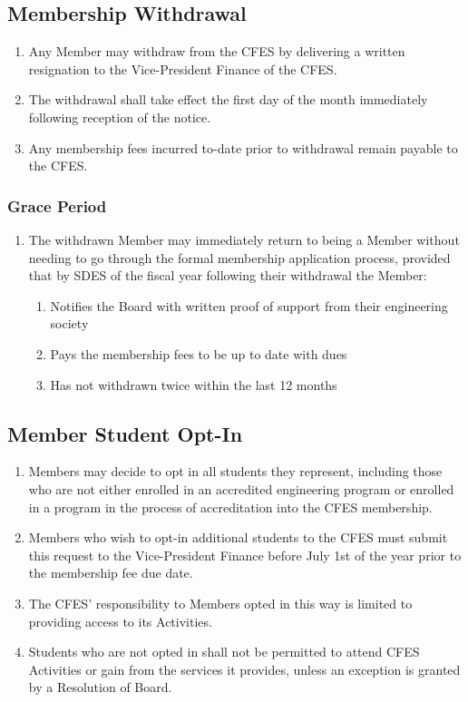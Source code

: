 \subsection{Membership Withdrawal}
\label{membership-membership-withdrawal}

\begin{enumerate}
 \item Any Member may withdraw from the CFES by delivering a written resignation to the Vice-President Finance of the CFES.
 \item The withdrawal shall take effect the first day of the month immediately following reception of the notice.
 \item Any membership fees incurred to-date prior to withdrawal remain payable to the CFES.
\end{enumerate}

\setcounter{subsubsection}{3}
\subsubsection{Grace Period}
\label{membership-withdrawal-grace-period}

\begin{enumerate}
 \item The withdrawn Member may immediately return to being a Member without needing to go through the formal membership application process, provided that by SDES of the fiscal year following their withdrawal the Member:
  \begin{enumerate}
   \item Notifies the Board with written proof of support from their engineering society
   \item Pays the membership fees to be up to date with dues
   \item Has not withdrawn twice within the last 12 months
  \end{enumerate}
\end{enumerate}

\subsection{Member Student Opt-In}
\label{membership-member-student-opt-in}

\begin{enumerate}
 \item Members may decide to opt in all students they represent, including those who are not either enrolled in an accredited engineering program or enrolled in a program in the process of accreditation into the CFES membership.
 \item Members who wish to opt-in additional students to the CFES must submit this request to the Vice-President Finance before July 1st of the year prior to the membership fee due date.
 \item The CFES’ responsibility to Members opted in this way is limited to providing access to its Activities.
 \item Students who are not opted in shall not be permitted to attend CFES Activities or gain from the services it provides, unless an exception is granted by a Resolution of Board.
\end{enumerate}
